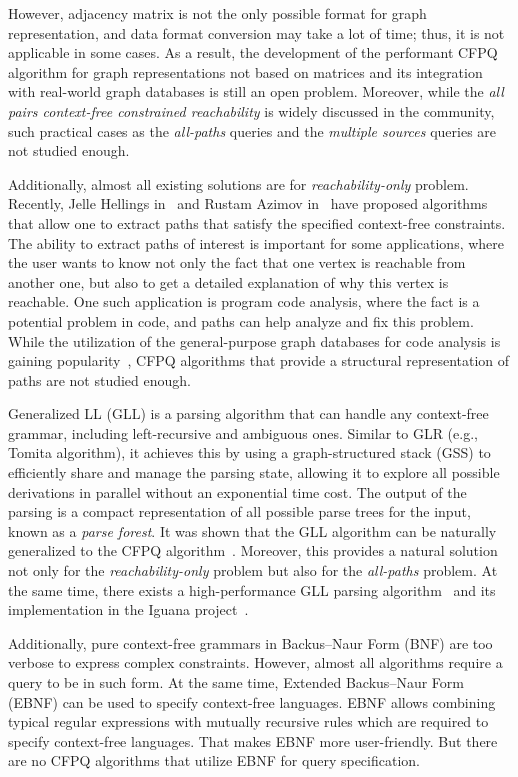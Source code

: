 \documentclass[
11pt,%
tightenlines,%
twoside,%
onecolumn,%
nobibnotes,%
nofootinbib,%
superscriptaddress,%
noshowpacs,%
longbibliography,%
centertags]%
{revtex4-2}
\begin{document}
However, adjacency matrix is not the only possible format for graph representation, and data format conversion may take a lot of time; thus, it is not applicable in some cases. As a result, the development of the performant CFPQ algorithm for graph representations not based on matrices and its integration with real-world graph databases is still an open problem. Moreover, while the \textit{all pairs context-free constrained reachability} is widely discussed in the community, such practical cases as the \textit{all-paths} queries and the \textit{multiple sources} queries are not studied enough.

Additionally, almost all existing solutions are for \textit{reachability-only} problem. Recently, Jelle Hellings in~\cite{Hellings2020ExplainingPQ} and Rustam Azimov in~\cite{10.1145/3461837.3464513} have proposed algorithms that allow one to extract paths that satisfy the specified context-free constraints. The ability to extract paths of interest is important for some applications, where the user wants to know not only the fact that one vertex is reachable from another one, but also to get a detailed explanation of why this vertex is reachable. One such application is program code analysis, where the fact is a potential problem in code, and paths can help analyze and fix this problem. While the utilization of the general-purpose graph databases for code analysis is gaining popularity~\cite{9064792}, CFPQ algorithms that provide a structural representation of paths are not studied enough. 

Generalized LL (GLL) is a parsing algorithm that can handle any context-free grammar, including left-recursive and ambiguous ones. Similar to GLR (e.g., Tomita algorithm), it achieves this by using a graph-structured stack (GSS) to efficiently share and manage the parsing state, allowing it to explore all possible derivations in parallel without an exponential time cost. The output of the parsing is a compact representation of all possible parse trees for the input, known as a \textit{parse forest}. It was shown that the GLL algorithm can be naturally generalized to the CFPQ algorithm~\cite{Grigorev:2017:CPQ:3166094.3166104}. Moreover, this provides a natural solution not only for the \textit{reachability-only} problem but also for the \textit{all-paths} problem. At the same time, there exists a high-performance GLL parsing algorithm~\cite{AfroozenFasterGll} and its implementation in the Iguana project~\cite{iguana-parser}. 

Additionally, pure context-free grammars in Backus--Naur Form (BNF) are too verbose to express complex constraints. However, almost all algorithms require a query to be in such form. At the same time, Extended Backus--Naur Form (EBNF) can be used to specify context-free languages. EBNF allows combining typical regular expressions with mutually recursive rules which are required to specify context-free languages. That makes EBNF more user-friendly. But there are no CFPQ algorithms that utilize EBNF for query specification.
\end{document}
